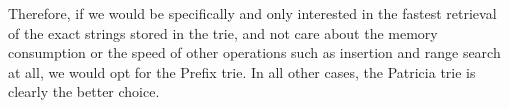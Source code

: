 \documentclass[essay]{fer}
\begin{document}
Therefore, if we would be specifically and only interested in the fastest retrieval of the exact strings stored in the trie,
and not care about the memory consumption or the speed of other operations such as insertion and range search at all,
we would opt for the Prefix trie.
In all other cases, the Patricia trie is clearly the better choice.







\backmatter{}
\end{document}
